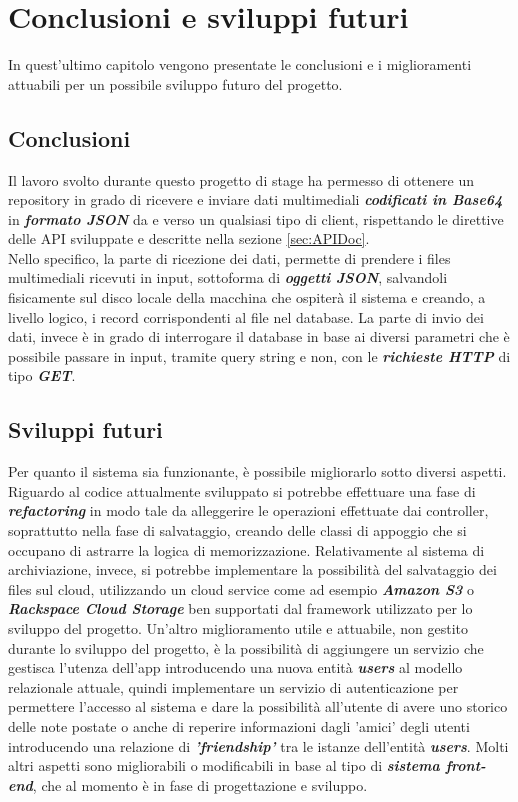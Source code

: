 \chapter{Conclusioni e sviluppi futuri}
In quest'ultimo capitolo vengono presentate le conclusioni e i miglioramenti attuabili per un possibile sviluppo futuro del progetto.

\section{Conclusioni}
Il lavoro svolto durante questo progetto di stage ha permesso di ottenere un repository in grado di ricevere e inviare dati multimediali \textit{\textbf{codificati in Base64}} in \textit{\textbf{formato JSON}} da e verso un qualsiasi tipo di client, rispettando le direttive delle API sviluppate e descritte nella sezione \ref{sec:APIDoc}. \\
Nello specifico, la parte di ricezione dei dati, permette di prendere i files multimediali ricevuti in input, sottoforma di \textit{\textbf{oggetti JSON}}, salvandoli fisicamente sul disco locale della macchina che ospiterà il sistema e creando, a livello logico, i record corrispondenti al file nel database.
La parte di invio dei dati, invece è in grado di interrogare il database in base ai diversi parametri che è possibile passare in input, tramite query string e non, con le \textit{\textbf{richieste HTTP}} di tipo \textit{\textbf{GET}}.

\section{Sviluppi futuri}
Per quanto il sistema sia funzionante, è possibile migliorarlo sotto diversi aspetti.
Riguardo al codice attualmente sviluppato si potrebbe effettuare una fase di \textit{\textbf{refactoring}} in modo tale da alleggerire le operazioni effettuate dai controller, soprattutto nella fase di salvataggio, creando delle classi di appoggio che si occupano di astrarre la logica di memorizzazione.
Relativamente al sistema di archiviazione, invece, si potrebbe implementare la possibilità del salvataggio dei files sul cloud, utilizzando un cloud service come ad esempio \textit{\textbf{Amazon S3}} o \textit{\textbf{Rackspace Cloud Storage}} ben supportati dal framework utilizzato per lo sviluppo del progetto.
Un'altro miglioramento utile e attuabile, non gestito durante lo sviluppo del progetto, è la possibilità di aggiungere un servizio che gestisca l'utenza dell'app introducendo una nuova entità \textit{\textbf{users}} al modello relazionale attuale, quindi implementare un servizio di autenticazione per permettere l'accesso al sistema e dare la possibilità all'utente di avere uno storico delle note postate o anche di reperire informazioni dagli 'amici' degli utenti introducendo una relazione di \textit{\textbf{'friendship'}} tra le istanze dell'entità \textit{\textbf{users}}.
Molti altri aspetti sono migliorabili o modificabili in base al tipo di \textit{\textbf{sistema front-end}}, che al momento è in fase di progettazione e sviluppo.

